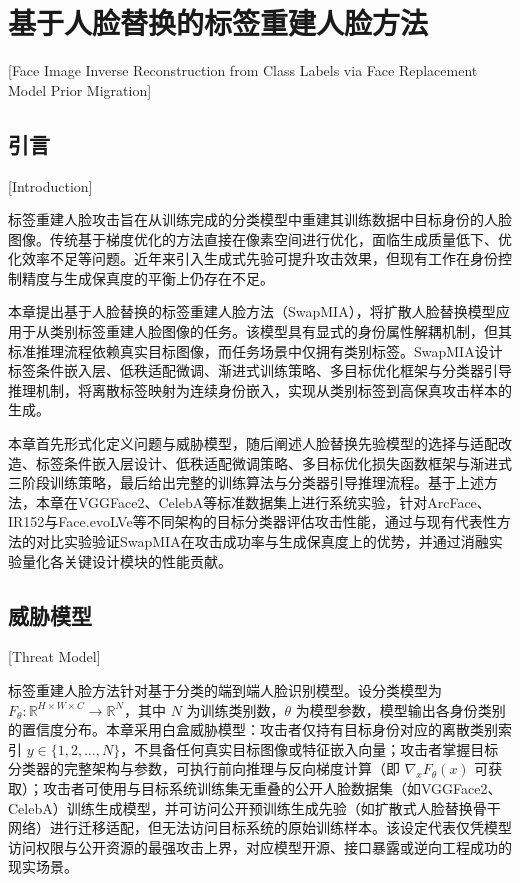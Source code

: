 
\chapter{基于人脸替换的标签重建人脸方法}[Face Image Inverse Reconstruction from Class Labels via Face Replacement Model Prior Migration]\label{chap:MIA}

\section{引言}[Introduction]

标签重建人脸攻击旨在从训练完成的分类模型中重建其训练数据中目标身份的人脸图像。传统基于梯度优化的方法直接在像素空间进行优化，面临生成质量低下、优化效率不足等问题。近年来引入生成式先验可提升攻击效果，但现有工作在身份控制精度与生成保真度的平衡上仍存在不足。

本章提出基于人脸替换的标签重建人脸方法（SwapMIA），将扩散人脸替换模型应用于从类别标签重建人脸图像的任务。该模型具有显式的身份属性解耦机制，但其标准推理流程依赖真实目标图像，而任务场景中仅拥有类别标签。SwapMIA设计标签条件嵌入层、低秩适配微调、渐进式训练策略、多目标优化框架与分类器引导推理机制，将离散标签映射为连续身份嵌入，实现从类别标签到高保真攻击样本的生成。

本章首先形式化定义问题与威胁模型，随后阐述人脸替换先验模型的选择与适配改造、标签条件嵌入层设计、低秩适配微调策略、多目标优化损失函数框架与渐进式三阶段训练策略，最后给出完整的训练算法与分类器引导推理流程。基于上述方法，本章在VGGFace2、CelebA等标准数据集上进行系统实验，针对ArcFace、IR152与Face.evoLVe等不同架构的目标分类器评估攻击性能，通过与现有代表性方法的对比实验验证SwapMIA在攻击成功率与生成保真度上的优势，并通过消融实验量化各关键设计模块的性能贡献。

\section{威胁模型}[Threat Model]
\label{sec:mia_problem}

标签重建人脸方法针对基于分类的端到端人脸识别模型。设分类模型为 $F_\theta: \mathbb{R}^{H \times W \times C} \to \mathbb{R}^N$，其中 $N$ 为训练类别数，$\theta$ 为模型参数，模型输出各身份类别的置信度分布。本章采用白盒威胁模型：攻击者仅持有目标身份对应的离散类别索引 $y \in \{1,2,\ldots,N\}$，不具备任何真实目标图像或特征嵌入向量；攻击者掌握目标分类器的完整架构与参数，可执行前向推理与反向梯度计算（即 $\nabla_x F_\theta(x)$ 可获取）；攻击者可使用与目标系统训练集无重叠的公开人脸数据集（如VGGFace2、CelebA）训练生成模型，并可访问公开预训练生成先验（如扩散式人脸替换骨干网络）进行迁移适配，但无法访问目标系统的原始训练样本。该设定代表仅凭模型访问权限与公开资源的最强攻击上界，对应模型开源、接口暴露或逆向工程成功的现实场景。

